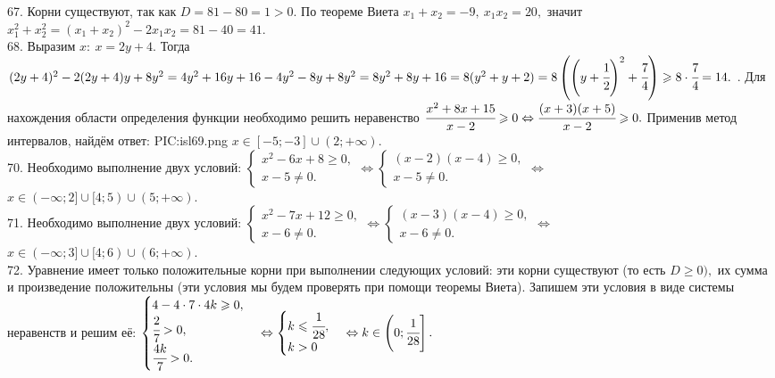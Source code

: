 67. Корни существуют, так как $D=81-80=1>0.$ По теореме Виета $x_1+x_2=-9,\ x_1x_2=20,$ значит $x_1^2+x_2^2=(x_1+x_2)^2-2x_1x_2=81-40=41.$\\
68. Выразим $x:\ x=2y+4.$ Тогда $(2y+4)^2-2(2y+4)y+8y^2=4y^2+16y+16-4y^2-8y+8y^2=8y^2+8y+16=8(y^2+y+2)=8\left(\left(y+\cfrac{1}{2}\right)^2+\cfrac{7}{4}\right)\geqslant8\cdot\cfrac{7}{4}=14.$\newpage
{}. Для нахождения области определения функции необходимо решить неравенство $\cfrac{x^2+8x+15}{x-2}\geqslant0\Leftrightarrow
\cfrac{(x+3)(x+5)}{x-2}\geqslant0.$ Применив метод интервалов, найдём ответ:
{{PIC:isl69.png}}
$x\in[-5;-3]\cup(2;+\infty).$\\
70. Необходимо выполнение двух условий: $\begin{cases} x^2-6x+8\geqslant0,\\ x-5\neq0.\end{cases}\Leftrightarrow
\begin{cases} (x-2)(x-4)\geqslant0,\\ x-5\neq0.\end{cases}
\Leftrightarrow$\\$ x\in (-\infty;2]\cup[4;5)\cup(5;+\infty).$\\
71. Необходимо выполнение двух условий: $\begin{cases} x^2-7x+12\geqslant0,\\ x-6\neq0.\end{cases}\Leftrightarrow
\begin{cases} (x-3)(x-4)\geqslant0,\\ x-6\neq0.\end{cases}
\Leftrightarrow$\\$ x\in (-\infty;3]\cup[4;6)\cup(6;+\infty).$\\
72. Уравнение имеет только положительные корни при выполнении следующих условий: эти корни существуют (то есть $D\geqslant0),$ их сумма и произведение положительны (эти условия мы будем проверять при помощи теоремы Виета). Запишем эти условия в виде системы неравенств и решим её: $\begin{cases} 4-4\cdot7\cdot4k\geqslant0,\\
\cfrac{2}{7}>0,\\ \cfrac{4k}{7}>0.\end{cases}\Leftrightarrow\begin{cases} k\leqslant\cfrac{1}{28},\\ k>0\end{cases}\Leftrightarrow
k\in \left(0;\cfrac{1}{28}\right].$\\
